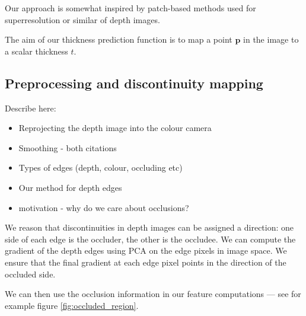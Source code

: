 \documentclass[10pt,twocolumn,letterpaper]{article}
\newcommand{\point}{\mathbf{p}}
\begin{document}
Our approach is somewhat inspired by patch-based methods used for superresolution or similar of depth images. 




The aim of our thickness prediction function is to map a point $\point$ in the image to a scalar thickness $t$.


\subsection{Preprocessing and discontinuity mapping}
Describe here:
\begin{itemize}
\item Reprojecting the depth image into the colour camera
\item Smoothing - both citations
\item Types of edges (depth, colour, occluding etc)
\item Our method for depth edges
\item motivation - why do we care about occlusions?
\end{itemize}

We reason that discontinuities in depth images can be assigned a direction: one side of each edge is the occluder, the other is the occludee. 
We can compute the gradient of the depth edges using PCA on the edge pixels in image space.
We ensure that the final gradient at each edge pixel points in the direction of the occluded side.

We can then use the occlusion information in our feature computations --- see for example figure \ref{fig:occluded_region}.
\end{document}

